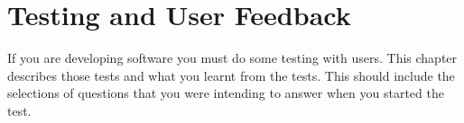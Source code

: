 \chapter{Testing and User Feedback}
\label{chap:testing}
If you are developing software you must do some testing with users.  This chapter describes those tests and what you learnt from the tests.  This should include the selections of questions that you were intending to answer when you started the test.  

